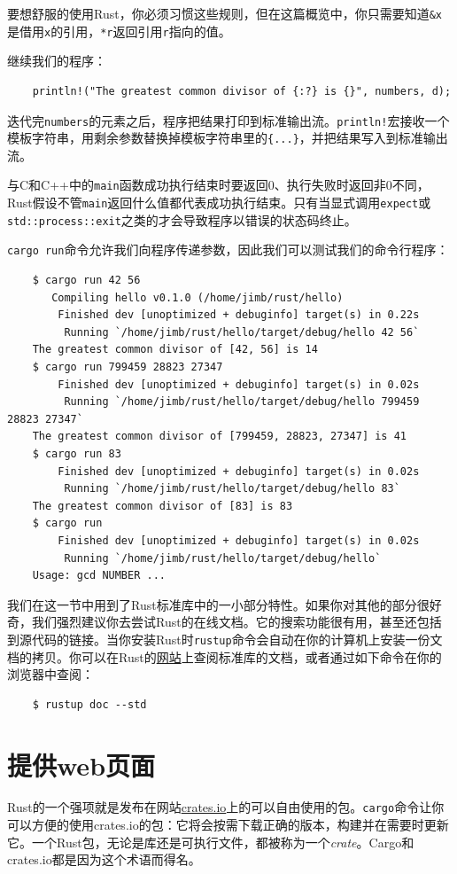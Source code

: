 要想舒服的使用Rust，你必须习惯这些规则，但在这篇概览中，你只需要知道\texttt{\&x}是借用\texttt{x}的引用，\texttt{*r}返回引用\texttt{r}指向的值。

继续我们的程序：
\begin{verbatim}
    println!("The greatest common divisor of {:?} is {}", numbers, d);
\end{verbatim}

迭代完\texttt{numbers}的元素之后，程序把结果打印到标准输出流。\texttt{println!}宏接收一个模板字符串，用剩余参数替换掉模板字符串里的\texttt{\{...\}}，并把结果写入到标准输出流。

与C和C++中的\texttt{main}函数成功执行结束时要返回0、执行失败时返回非0不同，Rust假设不管\texttt{main}返回什么值都代表成功执行结束。只有当显式调用\texttt{expect}或\texttt{std::process::exit}之类的才会导致程序以错误的状态码终止。

\texttt{cargo run}命令允许我们向程序传递参数，因此我们可以测试我们的命令行程序：
\begin{verbatim}
    $ cargo run 42 56
       Compiling hello v0.1.0 (/home/jimb/rust/hello)
        Finished dev [unoptimized + debuginfo] target(s) in 0.22s
         Running `/home/jimb/rust/hello/target/debug/hello 42 56`
    The greatest common divisor of [42, 56] is 14
    $ cargo run 799459 28823 27347
        Finished dev [unoptimized + debuginfo] target(s) in 0.02s
         Running `/home/jimb/rust/hello/target/debug/hello 799459 28823 27347`
    The greatest common divisor of [799459, 28823, 27347] is 41
    $ cargo run 83
        Finished dev [unoptimized + debuginfo] target(s) in 0.02s
         Running `/home/jimb/rust/hello/target/debug/hello 83`
    The greatest common divisor of [83] is 83
    $ cargo run
        Finished dev [unoptimized + debuginfo] target(s) in 0.02s
         Running `/home/jimb/rust/hello/target/debug/hello`
    Usage: gcd NUMBER ...
\end{verbatim}

我们在这一节中用到了Rust标准库中的一小部分特性。如果你对其他的部分很好奇，我们强烈建议你去尝试Rust的在线文档。它的搜索功能很有用，甚至还包括到源代码的链接。当你安装Rust时\texttt{rustup}命令会自动在你的计算机上安装一份文档的拷贝。你可以在Rust的\href{https://www.rust-lang.org/learn}{网站}上查阅标准库的文档，或者通过如下命令在你的浏览器中查阅：
\begin{verbatim}
    $ rustup doc --std
\end{verbatim}

\section{提供web页面}
Rust的一个强项就是发布在网站\href{https://crates.io}{crates.io}上的可以自由使用的包。\texttt{cargo}命令让你可以方便的使用crates.io的包：它将会按需下载正确的版本，构建并在需要时更新它。一个Rust包，无论是库还是可执行文件，都被称为一个\emph{crate}。Cargo和crates.io都是因为这个术语而得名。

